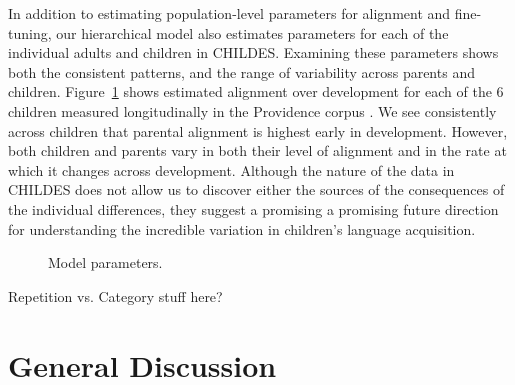 \documentclass[10pt,letterpaper]{article}
\begin{document}
In addition to estimating population-level parameters for alignment and fine-tuning, our hierarchical model also estimates parameters for each of the individual adults and children in CHILDES. Examining these parameters shows both the consistent patterns, and the range of variability across parents and children. Figure~\ref{fig:providence_hpds} shows estimated alignment over development for each of the 6 children measured longitudinally in the Providence corpus \cite{demuth2006}. We see consistently across children that parental alignment is highest early in development. However, both children and parents vary in both their level of alignment and in the rate at which it changes across development. Although the nature of the data in CHILDES does not allow us to discover either the sources of the consequences of the individual differences, they suggest a promising a promising future direction for understanding the incredible variation in children's language acquisition.

\begin{figure}[tb]
  \caption{\label{fig:providence_hpds} Model parameters.}
\end{figure}

Repetition vs. Category stuff here?

\section{General Discussion}

%
\end{document}

